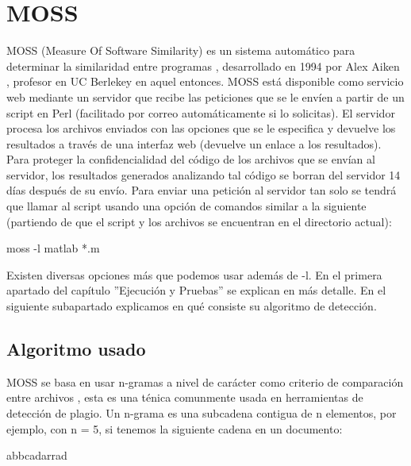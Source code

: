 \section{MOSS}

MOSS (Measure Of Software Similarity) es un sistema automático para determinar la similaridad entre programas \cite{Moss_web}, desarrollado en 1994 por Alex Aiken \cite{Moss_uso}, profesor en UC Berlekey en aquel entonces.
\newline
MOSS está disponible como servicio web mediante un servidor que recibe las peticiones que se le envíen a partir de un script en Perl (facilitado por correo automáticamente si lo solicitas). El servidor procesa los archivos enviados con las opciones que se le especifica y devuelve los resultados a través de una interfaz web (devuelve un enlace a los resultados).
\newline
Para proteger la confidencialidad del código de los archivos que se envían al servidor, los resultados generados analizando tal código se borran del servidor 14 días después de su envío.
\newline
Para enviar una petición al servidor tan solo se tendrá que llamar al script usando una opción de comandos similar a la siguiente (partiendo de que el script y los archivos se encuentran en el directorio actual):

\bigskip
\begin{center}
 moss -l matlab *.m
\end{center}
\bigskip

Existen diversas opciones más que podemos usar además de -l. En el primera apartado del capítulo ''Ejecución y Pruebas'' se explican en más detalle.  
\newline
En el siguiente subapartado explicamos en qué consiste su algoritmo de detección.

\subsection{Algoritmo usado}

MOSS se basa en usar n-gramas a nivel de carácter como criterio de comparación entre archivos \cite{Moss_algoritmo}, esta es una ténica comunmente usada en herramientas de detección de plagio. Un n-grama es una subcadena contigua de n elementos, por ejemplo, con n = 5, si tenemos la siguiente cadena en un documento:

\begin{center}
abbcadarrad
\end{center}

